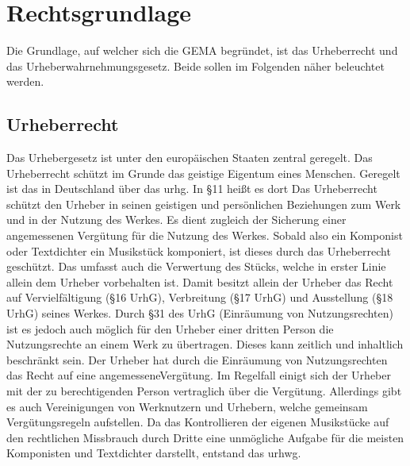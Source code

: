 \chapter{Rechtsgrundlage}
Die Grundlage, auf welcher sich die GEMA begründet, ist das Urheberrecht und das Urheberwahrnehmungsgesetz. Beide sollen im Folgenden näher beleuchtet werden. 
\section{Urheberrecht}
Das Urhebergesetz ist unter den europäischen Staaten zentral geregelt. Das Urheberrecht schützt im Grunde das geistige Eigentum eines Menschen. Geregelt ist das in Deutschland über das \gls{urhg}. In §11 heißt es dort \glqq Das Urheberrecht schützt den Urheber in seinen geistigen und persönlichen Beziehungen zum Werk und in der Nutzung des Werkes. Es dient zugleich der Sicherung einer angemessenen Vergütung für die Nutzung des Werkes.\grqq{} Sobald also ein Komponist oder Textdichter ein Musikstück komponiert, ist dieses durch das Urheberrecht geschützt. Das umfasst auch die Verwertung des Stücks, welche in erster Linie allein dem Urheber vorbehalten ist. Damit besitzt allein der Urheber das Recht auf Vervielfältigung (§16 UrhG), Verbreitung (§17 UrhG) und Ausstellung (§18 UrhG) seines Werkes. Durch §31 des UrhG (\glqq Einräumung von Nutzungsrechten\grqq) ist es jedoch auch möglich für den Urheber einer dritten Person die Nutzungsrechte an einem Werk zu übertragen. Dieses kann zeitlich und inhaltlich beschränkt sein. Der Urheber hat durch die Einräumung von Nutzungsrechten das Recht auf eine \glqq angemessene\grqq Vergütung. Im Regelfall einigt sich der Urheber mit der zu berechtigenden Person vertraglich über die Vergütung. Allerdings gibt es auch Vereinigungen von Werknutzern und Urhebern, welche gemeinsam Vergütungsregeln aufstellen.
\newline
\newline
Da das Kontrollieren der eigenen Musikstücke auf den rechtlichen Missbrauch durch Dritte eine unmögliche Aufgabe für die meisten Komponisten und Textdichter darstellt, entstand das \gls{urhwg}. 
